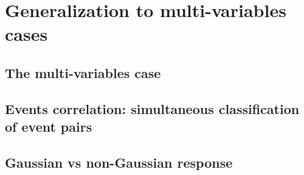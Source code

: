 \section{Generalization to multi-variables cases}
\subsection{The multi-variables case}

\subsection{Events correlation: simultaneous classification of event pairs}

\subsection{Gaussian vs non-Gaussian response}

